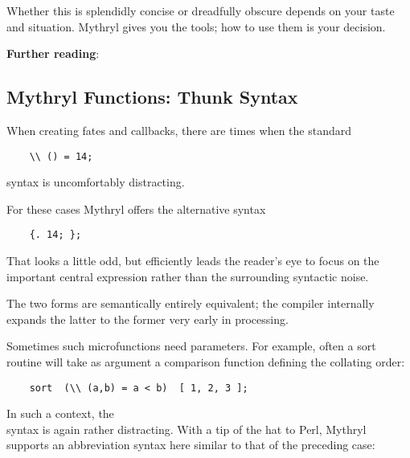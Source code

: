 Whether this is splendidly concise or dreadfully obscure 
depends on your taste and situation.  Mythryl gives you 
the tools;  how to use them is your decision.


{\bf Further reading}:

\begin{quotation}
\newline
{}\newline
\end{quotation}

\cutend*

\subsection{Mythryl Functions:  Thunk Syntax}

When creating fates and callbacks, there are times 
when the standard

\begin{verbatim}
    \\ () = 14;
\end{verbatim}

syntax is uncomfortably distracting.

For these cases Mythryl offers the alternative syntax

\begin{verbatim}
    {. 14; };
\end{verbatim}

That looks a little odd, but efficiently leads the reader's eye to focus 
on the important central expression rather than the surrounding syntactic 
noise.

The two forms are semantically entirely equivalent;  the compiler 
internally expands the latter to the former very early in processing.

Sometimes such microfunctions need parameters.  For example, often a sort 
routine will take as argument a comparison function defining the collating 
order:

\begin{verbatim}
    sort  (\\ (a,b) = a < b)  [ 1, 2, 3 ];
\end{verbatim}

In such a context, the {\tt \\} syntax is again rather distracting. 
With a tip of the hat to Perl, Mythryl supports an abbreviation 
syntax here similar to that of the preceding case:

